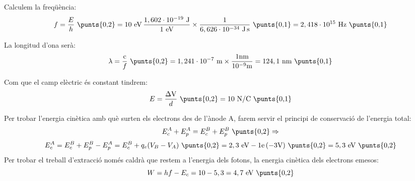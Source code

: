 \begin{solapartat}
Calculem la freqüència:
\[ f = \frac{E}{h}\ \text{\punts{0,2}} = 10\ \mathrm{eV}\,\frac{1,602\cdot 10^{-19}\ \mathrm{J}}{1\ \mathrm{eV}}\times\frac{1}{6,626\cdot 10^{-34}\ \mathrm{J\,s}}\ \text{\punts{0,1}} = 2,418\cdot 10^{15}\ \mathrm{Hz}\ \text{\punts{0,1}} \]

La longitud d'ona serà:
\[ \lambda = \frac{\mathrm{c}}{f}\ \text{\punts{0,2}} = 1,241\cdot 10^{-7}\ \mathrm{m}\times\frac{1\mathrm{nm}}{10^{-9}\mathrm{m}} = 124,1\ \mathrm{nm}\ \text{\punts{0,1}} \]

Com que el camp elèctric és constant tindrem:
\[ E = \frac{\Delta\mathrm{V}}{d}\ \text{\punts{0,2}} = 10\ \mathrm{N/C}\ \text{\punts{0,1}} \]
\end{solapartat}

\begin{solapartat}
Per trobar l'energia cinètica amb què surten els electrons des de l'ànode A, farem servir el principi de conservació de l'energia total:
\[ E_c^A + E_p^A = E_c^B + E_p^B\ \text{\punts{0,2}} \Rightarrow \]
\[ E_c^A = E_c^B + E_p^B - E_p^A = E_c^B + q_e(V_B - V_A)\ \text{\punts{0,2}} = 2,3\ \mathrm{eV} - 1\mathrm{e}\,(-3\mathrm{V})\ \text{\punts{0,2}} = 5,3\ \mathrm{eV}\ \text{\punts{0,2}} \]
Per trobar el treball d'extracció només caldrà que restem a l'energia dels fotons, la energia cinètica dels electrons emesos:
\[ W = hf - E_c = 10 - 5,3 = 4,7\ \mathrm{eV}\ \text{\punts{0,2}} \]
\end{solapartat}
